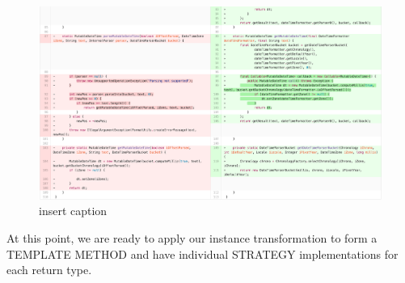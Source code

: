 \begin{figure}[H]
	\centering
	\includegraphics[width=\linewidth]{code101}
	\caption{insert caption}
\end{figure}

At this point, we are ready to apply our instance transformation to form a TEMPLATE METHOD and have individual STRATEGY implementations for each return type.

